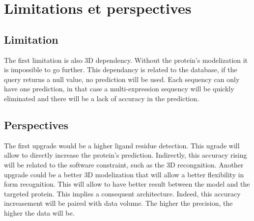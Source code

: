 \section{Limitations et perspectives}
\subsection{Limitation}
The first limitation is also 3D dependency. Without the protein's modelization it is impossible to go further. This dependancy is related to the database, if the query returns a null value, no prediction will be used.
\newline
Each sequency can only have one prediction, in that case a multi-expression sequency will be quickly eliminated and there will be a lack of accuracy in the prediction.
\subsection{Perspectives}
The first upgrade would be a higher ligand residue detection. This ugrade will allow to directly increase the protein's prediction. Indirectly, this accuracy rising will be related to the software constraint, such as the 3D recongnition. 
\newline Another upgrade could be a better 3D modelization that will allow a better flexibility in form recognition. This will allow to have better result between the model and the targeted protein.
\newline This implies a consequent architecture. Indeed, this accuracy increasement will be paired with data volume. The higher the  precision, the higher the data will be.
